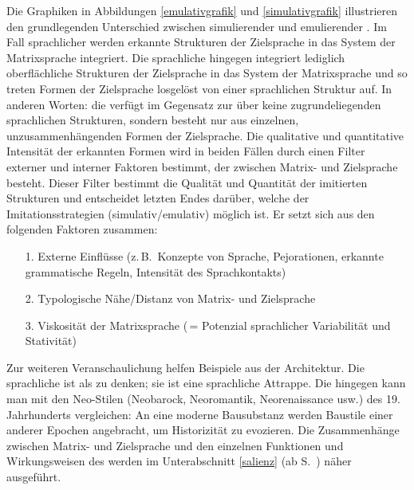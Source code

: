 \begin{itemize}
Die Graphiken in Abbildungen \ref{emulativgrafik}  und \ref{simulativgrafik} illustrieren den grundlegenden Unterschied zwischen simulierender und emulierender . Im Fall sprachlicher  werden erkannte Strukturen der Zielsprache in das System der Matrixsprache integriert. Die sprachliche  hingegen integriert lediglich oberflächliche Strukturen der Zielsprache in das System der Matrixsprache und so treten Formen der Zielsprache losgelöst von einer sprachlichen Struktur auf. In anderen Worten: die  verfügt im Gegensatz zur  über keine zugrundeliegenden sprachlichen Strukturen, sondern besteht nur aus einzelnen, unzusammenhängenden Formen der Zielsprache. Die qualitative und quantitative Intensität der erkannten Formen wird in beiden Fällen durch einen Filter externer und interner Faktoren bestimmt, der zwischen Matrix- und Zielsprache besteht. Dieser Filter bestimmt die Qualität und Quantität der imitierten Strukturen und entscheidet letzten Endes darüber, welche der Imitationsstrategien (simulativ/emulativ) möglich ist. Er setzt sich aus den folgenden Faktoren zusammen: 
\begin{itemize}
\item [1.] Externe Einflüsse (z.\,B.\, Konzepte von Sprache, Pejorationen, erkannte grammatische Regeln, Intensität des Sprachkontakts) 
\item [2.] Typologische Nähe/Distanz von Matrix- und Zielsprache
\item [3.] Viskosität der Matrixsprache (\,= Potenzial sprachlicher Variabilität und Stativität) 
\end{itemize}
\label{emulationsbegriff}
 Zur weiteren Veranschaulichung helfen Beispiele aus der Architektur. Die sprachliche  ist als  zu denken; sie ist eine sprachliche Attrappe. Die  hingegen kann man mit den Neo-Stilen (Neobarock, Neoromantik, Neorenaissance usw.) des 19. Jahrhunderts vergleichen: An eine moderne Bausubstanz werden Baustile einer anderer Epochen  angebracht, um Historizität zu evozieren. Die Zusammenhänge zwischen Matrix- und Zielsprache und den einzelnen Funktionen und Wirkungsweisen des  werden im Unterabschnitt \ref{salienz} (ab S.\, \pageref{salienz}) näher ausgeführt. 


\begin{figure}[p]
 \begin{center}
\end{center}
\end{figure}
\end{itemize}
